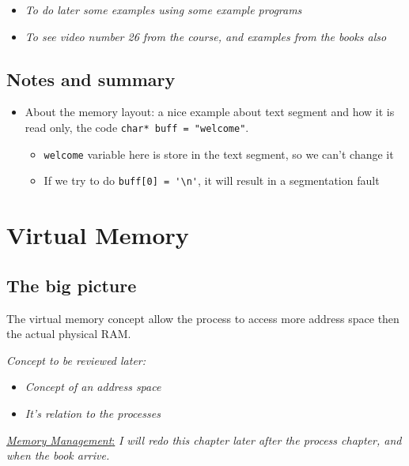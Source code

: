 \documentclass[12pt,a4paper]{book}
\begin{document}
\begin{itemize}

\item \textit{To do later some examples using some example programs}

\item \textit{To see video number 26 from the course, and examples from the books also}

\end{itemize}


\newpage
\section{Notes and summary}

\begin{itemize}

\item About the memory layout: a nice example about text segment and how it is read only, the code \verb|char* buff = "welcome"|.

    \begin{itemize}
        \item \verb|welcome| variable here is store in the text segment, so we can't change it

        \item If we try to do \verb|buff[0] = '\n'|, it will result in a segmentation fault
    \end{itemize}


\end{itemize}


\chapter{Virtual Memory}


\section{The big picture}

The virtual memory concept allow the process to access more address space then the actual physical RAM.

\textit{Concept to be reviewed later:}

\begin{itemize}

\item \textit{Concept of an address space}

\item \textit{It's relation to the processes}  


\end{itemize}


 \underline{\textit{Memory Management}:} \textit{I will redo this chapter later after the process chapter, and when the book arrive.} 









\end{document}
